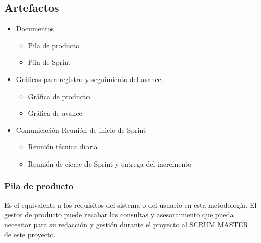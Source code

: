 \subsection{Artefactos}
\begin{itemize}
	\item	Documentos
	\begin{itemize}
		\item Pila de producto 
		\item Pila de Sprint 
	\end{itemize}
	\item Gráficas para registro y seguimiento del avance.
	\begin{itemize}
		\item Gráfica de producto 
		\item	Gráfica de avance 
	\end{itemize}
	\item Comunicación Reunión de inicio de Sprint
	\begin{itemize}
		\item	Reunión técnica diaria
		\item	Reunión de cierre de Sprint y entrega del incremento
	\end{itemize}
\end{itemize}

\subsubsection{Pila de producto}
\hspace*{2em}Es el equivalente a los requisitos del sistema o del usuario en esta metodología.  El gestor de producto puede recabar las consultas y asesoramiento que pueda necesitar para su redacción y gestión durante el proyecto al SCRUM MASTER de este proyecto.

